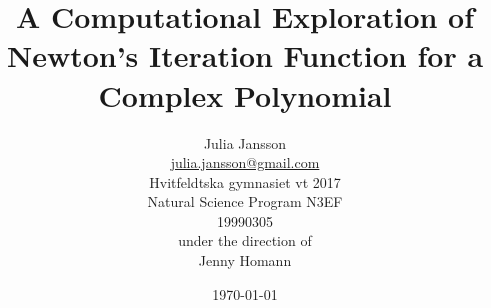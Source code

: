 \title{
A Computational Exploration of Newton's Iteration Function for a Complex Polynomial
}

\author{
Julia Jansson\\
\url{julia.jansson@gmail.com}
\\
Hvitfeldtska gymnasiet vt 2017\\
Natural Science Program N3EF\\
19990305
\vspace{0.5in}\\
under the direction of\\
Jenny Homann
\vspace{1in}
}

\date{\today}